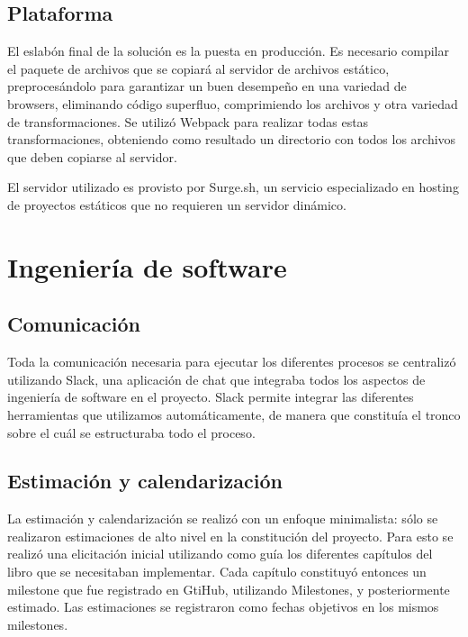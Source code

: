 \documentclass[a4paper,11pt]{article}
\begin{document}
\subsection{Plataforma}

El eslabón final de la solución es la puesta en producción. Es necesario compilar el paquete de archivos que se copiará al servidor de archivos estático, preprocesándolo para garantizar un buen desempeño en una variedad de browsers, eliminando código superfluo, comprimiendo los archivos y otra variedad de transformaciones. Se utilizó Webpack\cite{webpack} para realizar todas estas transformaciones, obteniendo como resultado un directorio con todos los archivos que deben copiarse al servidor.

El servidor utilizado es provisto por Surge.sh\cite{surge}, un servicio especializado en hosting de proyectos estáticos que no requieren un servidor dinámico.

\section{Ingeniería de software}

\subsection{Comunicación}

Toda la comunicación necesaria para ejecutar los diferentes procesos se centralizó utilizando Slack\cite{slack}, una aplicación de chat que integraba todos los aspectos de ingeniería de software en el proyecto. Slack permite integrar las diferentes herramientas que utilizamos automáticamente, de manera que constituía el tronco sobre el cuál se estructuraba todo el proceso.

\subsection{Estimación y calendarización}

La estimación y calendarización se realizó con un enfoque minimalista: sólo se realizaron estimaciones de alto nivel en la constitución del proyecto. Para esto se realizó una elicitación inicial utilizando como guía los diferentes capítulos del libro que se necesitaban implementar. Cada capítulo constituyó entonces un milestone que fue registrado en GtiHub\cite{github}, utilizando Milestones\cite{githubmilestones}, y posteriormente estimado. Las estimaciones se registraron como fechas objetivos en los mismos milestones.
\end{document}
